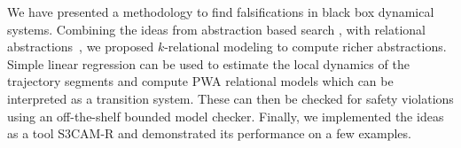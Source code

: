
We have presented a methodology to find falsifications in black box
dynamical systems. Combining the ideas from abstraction based search
\cite{zutshi2014multiple}, with relational
abstractions~\cite{sankaranarayanan2011relational}, we proposed $k$-relational
modeling to compute richer abstractions. Simple linear regression can
be used to estimate the local dynamics of the trajectory segments and
compute PWA relational models which can be interpreted as a transition
system.  These can then be checked for safety violations using an
off-the-shelf bounded model checker.  Finally, we implemented the
ideas as a tool S3CAM-R and demonstrated its performance on a few
examples.







